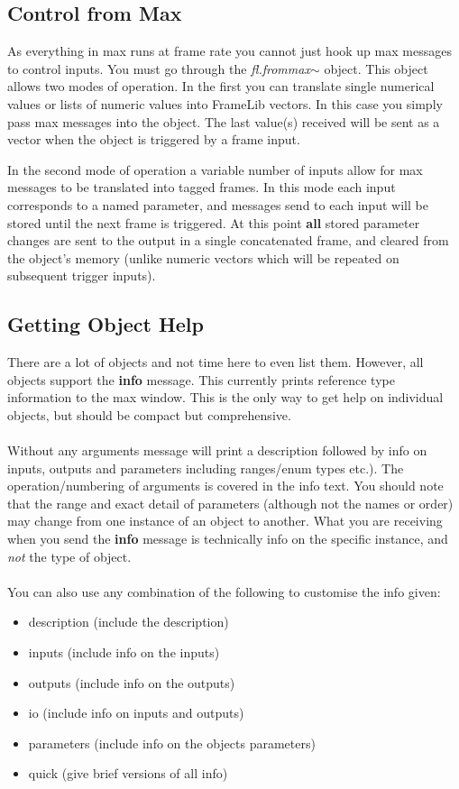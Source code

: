\documentclass{article}
\newcommand{\flobject}[1]{\textit{fl.#1$\sim$}}
\begin{document}
\subsection{Control from Max}

As everything in max runs at frame rate you cannot just hook up max messages to control inputs. You must go through the \flobject{frommax} object. This object allows two modes of operation. In the first you can translate single numerical values or lists of numeric values into FrameLib vectors. In this case you simply pass max messages into the object. The last value(s) received will be sent as a vector when the object is triggered by a frame input.

In the second mode of operation a variable number of  inputs allow for max messages to be translated into tagged frames. In this mode each input corresponds to a named parameter, and messages send to each input will be stored until the next frame is triggered. At this point \textbf{all} stored parameter changes are sent to the output in a single concatenated frame, and cleared from the object's memory (unlike numeric vectors which will be repeated on subsequent trigger inputs).

\subsection{Getting Object Help}

There are a lot of objects and not time here to even list them. However, all objects support the \textbf{info} message. This currently prints reference type information to the max window. This is the only way to get help on individual objects, but should be compact but comprehensive.
\\ \\
Without any arguments message will print a description followed by info on inputs, outputs and parameters including ranges/enum types etc.). The operation/numbering of arguments is covered in the info text. You should note that the range and exact detail of parameters (although not the names or order) may change from one instance of an object to another. What you are receiving when you send the \textbf{info} message is technically info on the specific instance, and \textit{not} the type of object.
\\ \\
You can also use any combination of the following to customise the info given:
 
 \begin{itemize}
 \item{description (include the description)}
 \item{inputs (include info on the inputs)}
 \item{outputs  (include info on the outputs)}
 \item{io (include info on inputs and outputs)}
 \item{parameters (include info on the objects parameters)}
 \item{quick (give brief versions of all info)}
  \end{itemize}
\end{document}
